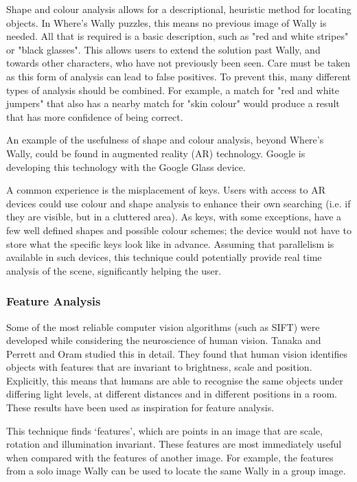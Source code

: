 \documentclass[../main.tex]{subfiles}
\begin{document}
      Shape and colour analysis allows for a descriptional, heuristic method for locating objects.
      In Where's Wally puzzles, this means no previous image of Wally is needed.
      All that is required is a basic description, such as "red and white stripes" or "black glasses".
      This allows users to extend the solution past Wally, and towards other characters, who have not previously been seen.
      Care must be taken as this form of analysis can lead to false positives.
      To prevent this, many different types of analysis should be combined.
      For example, a match for "red and white jumpers" that also has a nearby match for "skin colour" would produce a result that has more confidence of being correct.

      An example of the usefulness of shape and colour analysis, beyond Where's Wally, could be found in augmented reality (AR) technology.
      Google is developing this technology with the Google Glass device\cite{googleglass}.

      A common experience is the misplacement of keys.
      Users with access to AR devices could use colour and shape analysis to enhance their own searching (i.e. if they are visible, but in a cluttered area).
      As keys, with some exceptions, have a few well defined shapes and possible colour schemes; the device would not have to store what the specific keys look like in advance.
      Assuming that parallelism is available in such devices, this technique could potentially provide real time analysis of the scene, significantly helping the user.
    \subsubsection{Feature Analysis}
      \label{bkg_feature_analysis}
      Some of the most reliable computer vision algorithms (such as SIFT\cite{sift}) were developed while considering the neuroscience of human vision.
      Tanaka\cite{mechobjrecog} and Perrett and Oram\cite{perretthv} studied this in detail.
      They found that human vision identifies objects with features that are invariant to brightness, scale and position.
      Explicitly, this means that humans are able to recognise the same objects under differing light levels, at different distances and in different positions in a room.
      These results have been used as inspiration for feature analysis.

      This technique finds `features', which are points in an image that are scale, rotation and illumination invariant.
      These features are most immediately useful when compared with the features of another image.
      For example, the features from a solo image Wally can be used to locate the same Wally in a group image.
\end{document}
